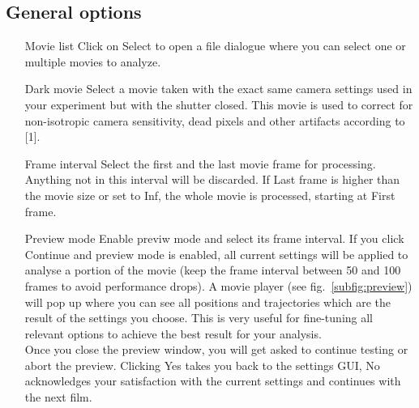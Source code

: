 \documentclass[11pt,onside]{report}
\numberwithin{equation}{chapter}
\begin{document}
\subsection*{General options}
\begin{itemize}[leftmargin=2cm]
\item[Movie list] Click on \textsf{Select} to open a file dialogue where you can select one or multiple movies to analyze.
\item[Dark movie] Select a movie taken with the exact same camera settings used in your experiment but with the shutter closed. This movie is used to correct for non-isotropic camera sensitivity, dead pixels and other artifacts according to [1].
\item[Frame interval] Select the first and the last movie frame for processing. Anything not in this interval will be discarded. If \textsf{Last frame} is higher than the movie size or set to \textsf{Inf}, the whole movie is processed, starting at \textsf{First frame}.
\item[Preview mode] Enable previw mode and select its frame interval. If you click \textsf{Continue} and preview mode is enabled, all current settings will be applied to analyse a portion of the movie (keep the frame interval between 50 and 100 frames to avoid performance drops). A movie player (see fig.~\ref{subfig:preview}) will pop up where you can see all positions and trajectories which are the result of the settings you choose. This is very useful for fine-tuning all relevant options to achieve the best result for your analysis.\\
Once you close the preview window, you will get asked to continue testing or abort the preview. Clicking \textsf{Yes} takes you back to the settings GUI, \textsf{No} acknowledges your satisfaction with the current settings and continues with the next film.
\end{itemize}

\end{document}
